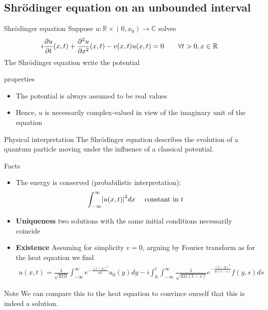 \subsection{Shrödinger equation on an unbounded interval}

\begin{definition}{Shrödinger equation}
	Suppose $u : \mathbb{R} \times \left(0, x_0\right) \to \mathbb{C}$ solves 
	\begin{align*} 
		i \frac{\partial u}{\partial t} \left(x, t\right) + \frac{\partial^2 u}{\partial x^2} \left(x, t\right) - v\left(x, t\right)u\left(x, t\right) = 0 \mathspace \mathspace \forall t > 0, x \in \mathbb{R}
	\end{align*}
	The Shrödinger equation write the potential
\end{definition}
\begin{parag}{properties}
    \begin{itemize}
        \item The potential is always assumed to be real values
        \item Hence, $u$ is necessarily complex-valued in view of the imaginary unit of the equation
    \end{itemize}
	\begin{subparag}{Physical interpretation}
	    The Shrödinger equation describes the evolution of a quantum particle moving under the influence of a classical potential.
	\end{subparag}
\end{parag}
\begin{parag}{Facts}
    \begin{itemize}
		\item The energy is conserved (probabilistic interpretation):
	\begin{align*} 
		\int_{-\infty}^{\infty} \left|u\left(x, t\right)\right|^2 dx \mathspace \text{ constant in }t
	\end{align*}
	\item \textbf{Uniqueness} two solutions with the same initial conditions necessarily coincide
	\item \textbf{Existence} Assuming for simplicity $v= 0$, arguing by Fourier transform as for the heat equation we find 
		\begin{align*} 
			u\left(x, t\right) = \frac{1}{\sqrt{4\pi it}}\int_{-\infty}^{\infty}e^{-\frac{\left(x-y\right)^2}{4it}}u_0\left(y\right)dy - i \int_0^{t}\int_{-\infty}^{\infty}\frac{1}{\sqrt{4\pi i \left(t-s\right)}}e^{-\frac{\left(x-y\right)^2}{4i\left(t-s\right)}}f\left(y, s\right)ds
		\end{align*}
    \end{itemize}
	\begin{subparag}{Note}
	    We can compare this to the heat equation to convince ourself that this is indeed a solution.
	\end{subparag}
\end{parag}


